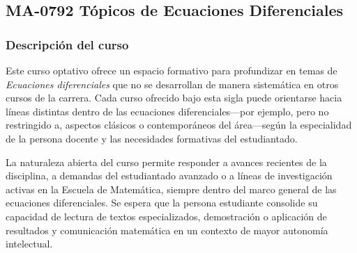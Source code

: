 \newpage
\subsection*{MA-0792 Tópicos de Ecuaciones Diferenciales}

\hypertarget{MA0792}{}
\begin{refsection}
\begin{table}[H]
\end{table}

\subsubsection*{Descripción del curso}

Este curso optativo ofrece un espacio formativo para profundizar en temas de \emph{Ecuaciones diferenciales} que no se desarrollan de manera sistemática en otros cursos de la carrera. Cada curso ofrecido bajo esta sigla puede orientarse hacia líneas distintas dentro de las ecuaciones diferenciales---por ejemplo, pero no restringido a, aspectos clásicos o contemporáneos del área---según la especialidad de la persona docente y las necesidades formativas del estudiantado.

La naturaleza abierta del curso permite responder a avances recientes de la disciplina, a demandas del estudiantado avanzado o a líneas de investigación activas en la Escuela de Matemática, siempre dentro del marco general de las ecuaciones diferenciales. Se espera que la persona estudiante consolide su capacidad de lectura de textos especializados, demostración o aplicación de resultados y comunicación matemática en un contexto de mayor autonomía intelectual.


\end{refsection}
